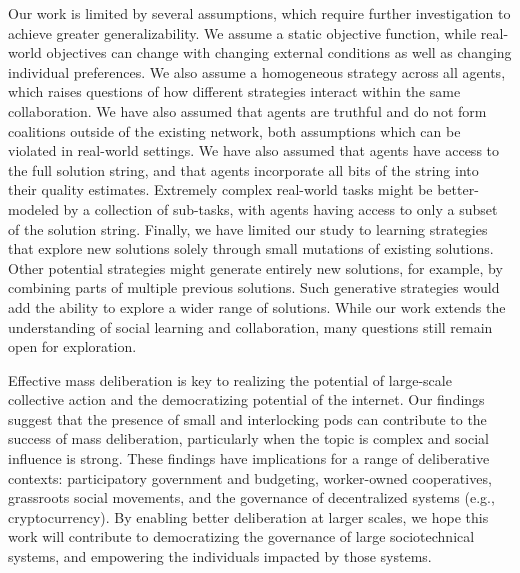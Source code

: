 Our work is limited by several assumptions, which require further investigation to achieve greater generalizability. We assume a static objective function, while real-world objectives can change with changing external conditions as well as changing individual preferences. We also assume a homogeneous strategy across all agents, which raises questions of how different strategies interact within the same collaboration. We have also assumed that agents are truthful and do not form coalitions outside of the existing network, both assumptions which can be violated in real-world settings.
We have also assumed that agents have access to the full solution string, and that agents incorporate all bits of the string into their quality estimates. Extremely complex real-world tasks might be better-modeled by a collection of sub-tasks, with agents having access to only a subset of the solution string.
Finally, we have limited our study to learning strategies that explore new solutions solely through small mutations of existing solutions. Other potential strategies might generate entirely new solutions, for example, by combining parts of multiple previous solutions. Such generative strategies would add the ability to explore a wider range of solutions. While our work extends the understanding of social learning and collaboration, many questions still remain open for exploration.

Effective mass deliberation is key to realizing the potential of large-scale collective action and the democratizing potential of the internet. Our findings suggest that the presence of small and interlocking pods can contribute to the success of mass deliberation, particularly when the topic is complex and social influence is strong. These findings have implications for a range of deliberative contexts: participatory government and budgeting, worker-owned cooperatives, grassroots social movements, and the governance of decentralized systems (e.g., cryptocurrency). By enabling better deliberation at larger scales, we hope this work will contribute to democratizing the governance of large sociotechnical systems, and empowering the individuals impacted by those systems.

